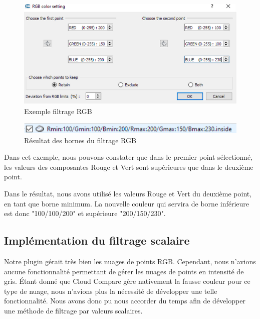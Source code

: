 \documentclass[12pt,titlepage,french]{article}
\begin{document}
\begin{figure}[H]
 \caption{\label{} Exemple filtrage RGB}
 \begin{center}
 \includegraphics[width=1\textwidth]{./img/rgb_ui.PNG}
  \end{center}
\end{figure}

\begin{figure}[H]
 \caption{\label{} Résultat des bornes du filtrage RGB}
 \begin{center}
 \includegraphics[width=1\textwidth]{./img/rgb_res.PNG}
  \end{center}
\end{figure}

Dans cet exemple, nous pouvons constater que dans le premier point sélectionné, les valeurs des composantes Rouge et Vert sont supérieures que dans le deuxième point. \newline

Dans le résultat, nous avons utilisé les valeurs Rouge et Vert du deuxième point, en tant que borne minimum. La nouvelle couleur qui servira de borne inférieure est donc "100/100/200" et supérieure "200/150/230".

\subsection{Implémentation du filtrage scalaire}

Notre plugin gérait très bien les nuages de points RGB. Cependant, nous n'avions aucune fonctionnalité permettant de gérer les nuages de points en intensité de gris. Étant donné que Cloud Compare gère nativement la fausse couleur pour ce type de nuage, nous n'avions plus la nécessité de développer une telle fonctionnalité. Nous avons donc pu nous accorder du temps afin de développer une méthode de filtrage par valeurs scalaires. \newline
\end{document}
